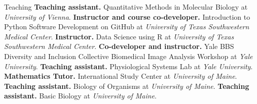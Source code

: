 \begin{rubric}{Teaching}
\entry*[2024--2025]%
	\textbf{Teaching assistant.} Quantitative Methods in Molecular Biology at \emph{University of Vienna}.
%
\entry*[2023]%
	\textbf{Instructor and course co-developer.} Introduction to Python Software Development on GitHub at \emph{University of Texas Southwestern Medical Center}.
%
\entry*[2022 -- 2023]%
	\textbf{Instructor.} Data Science using R at \emph{University of Texas Southwestern Medical Center}.
% 
\entry*[2021]%
	\textbf{Co-developer and instructor.} Yale BBS Diversity and Inclusion Collective Biomedical Image Analysis Workshop at \emph{Yale University}. 
%
\entry*[2018 -- 2020]%
	\textbf{Teaching assistant.} Physiological Systems Lab at \emph{Yale University}. 
%
\entry*[2015 -- 2016]%
	\textbf{Mathematics Tutor.} International Study Center at \emph{University of Maine}.
%
\entry*[2015]%
	\textbf{Teaching assistant.} Biology of Organisms at \emph{University of Maine}.
%
\entry*[2014]%
	\textbf{Teaching assistant.} Basic Biology at \emph{University of Maine}.
\end{rubric}